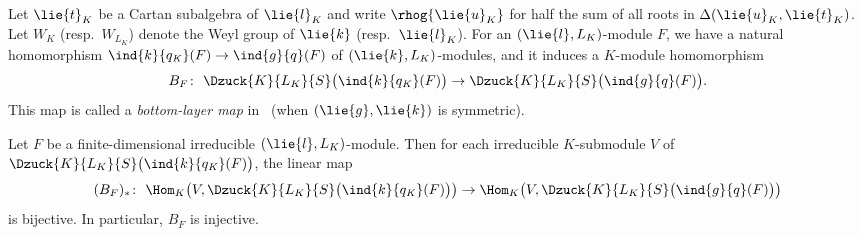 Let $\lie{t}_K$ be a Cartan subalgebra of $\lie{l}_K$
and write $\rhog{\lie{u}_K}$ for half the sum of all roots in $\Delta(\lie{u}_K, \lie{t}_K)$.
Let $W_K$ (resp.\ $W_{L_K}$) denote the Weyl group of $\lie{k}$ (resp.\ $\lie{l}_K$).
For an $(\lie{l}, L_K)$-module $F$, we have a natural homomorphism $\ind{k}{q_\mathit{K}}(F) \rightarrow \ind{g}{q}(F)$ of $(\lie{k}, L_K)$-modules, and it induces a $K$-module homomorphism
\begin{align*}
	B_F\colon\ \Dzuck{K}{L_K}{S}\bigl(\ind{k}{q_\mathit{K}}(F)\bigr) \rightarrow \Dzuck{K}{L_K}{S}\bigl(\ind{g}{q}(F)\bigr).
\end{align*}
This map is called a \emph{bottom-layer map} in~\cite[p.~365]{KnVo95_cohomological_induction} (when $(\lie{g}, \lie{k})$ is symmetric).

\begin{Lemma}\label{lem:MinimalTypeOne}
	Let $F$ be a finite-dimensional irreducible $(\lie{l}, L_K)$-module.
	Then for each irreducible $K$-submodule $V$ of $\Dzuck{K}{L_K}{S}\bigl(\ind{k}{q_\mathit{K}}(F)\bigr)$,
	the linear map
	\begin{align*}
		(B_F)_*\colon\ \Hom_{K}\bigl(V, \Dzuck{K}{L_K}{S}\bigl(\ind{k}{q_\mathit{K}}(F)\bigr)\bigr) \rightarrow \Hom_{K}\bigl(V, \Dzuck{K}{L_K}{S}\bigl(\ind{g}{q}(F)\bigr)\bigr)
	\end{align*}
	is bijective.
	In particular, $B_F$ is injective.
\end{Lemma}

